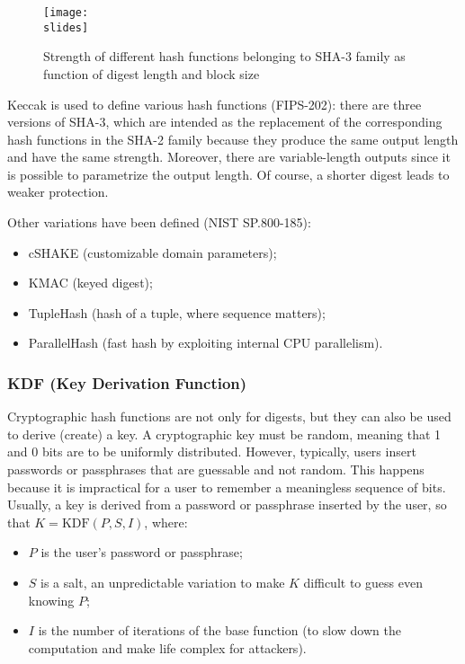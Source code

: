 \begin{figure}[h]
    \centering
    \texttt{[image: \\slides]}
    \caption{Strength of different hash functions belonging to SHA-3 family as function of digest
        length and block size}
\end{figure}

Keccak is used to define various hash functions (FIPS-202): there are three versions of SHA-3, which are intended as the replacement of the corresponding hash functions in the SHA-2 family because they produce the same output length and have the same strength. Moreover, there are variable-length outputs since it is possible to parametrize the output length. Of course, a shorter digest leads to weaker protection.

Other variations have been defined (NIST SP.800-185):
\begin{itemize}
    \item cSHAKE (customizable domain parameters);
    \item KMAC (keyed digest);
    \item TupleHash (hash of a tuple, where sequence matters);
    \item ParallelHash (fast hash by exploiting internal CPU parallelism).
\end{itemize}


\subsubsection{KDF (Key Derivation Function)}
Cryptographic hash functions are not only for digests, but they can also be used to derive (create) a key.
A cryptographic key must be random, meaning that 1 and 0 bits are to be uniformly distributed. However, typically, users insert passwords or passphrases that are guessable and not random. This happens because it is impractical for a user to remember a meaningless sequence of bits. Usually, a key is derived from a password or passphrase inserted by the user, so that \(K = \text{KDF}(P, S, I)\), where:
\begin{itemize}
    \item \(P\) is the user's password or passphrase;
    \item \(S\) is a salt, an unpredictable variation to make \(K\) difficult to guess even knowing \(P\);
    \item \(I\) is the number of iterations of the base function (to slow down the computation and make life complex for attackers).
\end{itemize}

